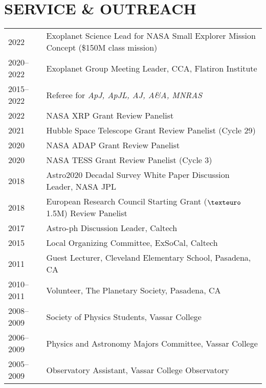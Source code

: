 \section{\large SERVICE \& OUTREACH}
\begin{tabular}{ll}
2022 & Exoplanet Science Lead for NASA Small Explorer Mission Concept (\$150M class mission)\\
2020--2022 & Exoplanet Group Meeting Leader, CCA, Flatiron Institute\\
2015--2022 & Referee for \textit{ApJ, ApJL, AJ, A\&A, MNRAS}\\
2022 & NASA XRP Grant Review Panelist \\
2021 & Hubble Space Telescope Grant Review Panelist (Cycle 29)\\
2020 & NASA ADAP Grant Review Panelist \\
2020 & NASA TESS Grant Review Panelist (Cycle 3)\\
2018 & Astro2020 Decadal Survey White Paper Discussion Leader, NASA JPL\\
2018 & European Research Council Starting Grant ($\texteuro$1.5M) Review Panelist \\
2017 & Astro-ph Discussion Leader, Caltech\\
2015 & Local Organizing Committee, ExSoCal, Caltech\\
2011 & Guest Lecturer, Cleveland Elementary School, Pasadena, CA\\
2010--2011 & Volunteer, The Planetary Society, Pasadena, CA\\
2008--2009 & Society of Physics Students, Vassar College\\
2006--2009 & Physics and Astronomy Majors Committee, Vassar College\\
2005--2009 & Observatory Assistant, Vassar College Observatory\\
\end{tabular}